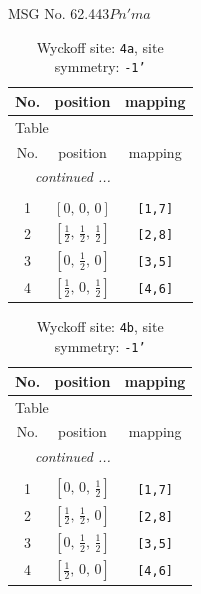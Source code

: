 \documentclass[fleqn,8pt]{jsarticle}
\begin{document}
\setcounter{MaxMatrixCols}{32}

\renewcommand{\tablename}{Table~}
\renewcommand{\figurename}{Figure~}
\begin{center}
\LARGE
MSG No. 62.443\quad$Pn'ma$
\end{center}
\renewcommand{\arraystretch}{1.2}
\begin{longtable}{ccc}
\caption{Wyckoff site: {\tt 4a}, site symmetry: {\tt -1'}}
 \\
 \hline \hline
No. & position & mapping \\ \hline \endfirsthead

\multicolumn{2}{l}{\tablename\ \thetable{}} \\
 \hline \hline
No. & position & mapping \\ \hline \endhead

 \hline \hline
\multicolumn{2}{r}{\footnotesize\it continued ...} \\ \endfoot

 \hline \hline
\multicolumn{2}{r}{} \\ \endlastfoot

1 & $\left[ 0,\, 0,\, 0 \right]$ & {\tt [1,7]} \\ \hline
2 & $\left[ \frac{1}{2},\, \frac{1}{2},\, \frac{1}{2} \right]$ & {\tt [2,8]} \\ \hline
3 & $\left[ 0,\, \frac{1}{2},\, 0 \right]$ & {\tt [3,5]} \\ \hline
4 & $\left[ \frac{1}{2},\, 0,\, \frac{1}{2} \right]$ & {\tt [4,6]} \\
\end{longtable}
\renewcommand{\arraystretch}{1.2}
\begin{longtable}{ccc}
\caption{Wyckoff site: {\tt 4b}, site symmetry: {\tt -1'}}
 \\
 \hline \hline
No. & position & mapping \\ \hline \endfirsthead

\multicolumn{2}{l}{\tablename\ \thetable{}} \\
 \hline \hline
No. & position & mapping \\ \hline \endhead

 \hline \hline
\multicolumn{2}{r}{\footnotesize\it continued ...} \\ \endfoot

 \hline \hline
\multicolumn{2}{r}{} \\ \endlastfoot

1 & $\left[ 0,\, 0,\, \frac{1}{2} \right]$ & {\tt [1,7]} \\ \hline
2 & $\left[ \frac{1}{2},\, \frac{1}{2},\, 0 \right]$ & {\tt [2,8]} \\ \hline
3 & $\left[ 0,\, \frac{1}{2},\, \frac{1}{2} \right]$ & {\tt [3,5]} \\ \hline
4 & $\left[ \frac{1}{2},\, 0,\, 0 \right]$ & {\tt [4,6]} \\
\end{longtable}
\end{document}
